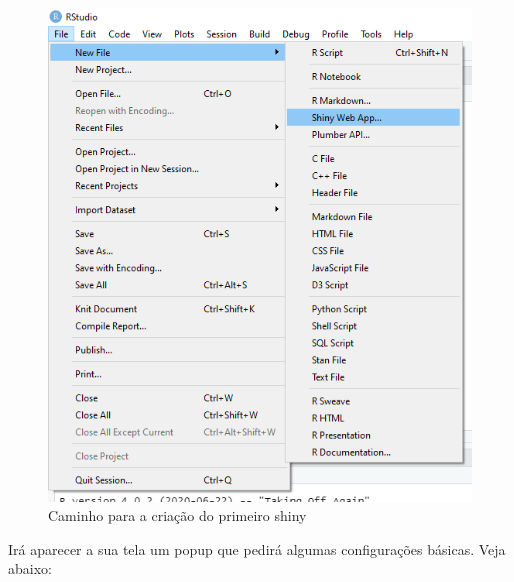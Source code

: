 \documentclass[
]{book}
\begin{document}
\begin{figure}
\centering
\includegraphics{./imagens/cap10imagem1.png}
\caption{Caminho para a criação do primeiro shiny}
\end{figure}

Irá aparecer a sua tela um popup que pedirá algumas configurações básicas. Veja abaixo:
\end{document}
